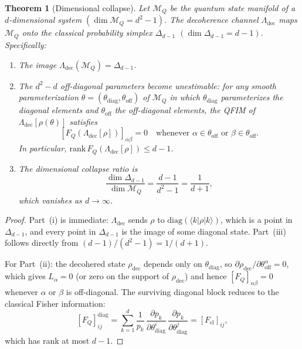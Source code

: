 \documentclass[12pt,a4paper]{article}
\newtheorem{theorem}{Theorem}[section]
\theoremstyle{definition}
\theoremstyle{remark}
\begin{document}
\begin{theorem}[Dimensional collapse]
\label{thm:dim-collapse}
Let $\mathcal{M}_Q$ be the quantum state manifold of a $d$-dimensional system $(\dim \mathcal{M}_Q = d^2 - 1)$. The decoherence channel $\Lambda_{\mathrm{dec}}$ maps $\mathcal{M}_Q$ onto the classical probability simplex $\Delta_{d-1}$ $(\dim \Delta_{d-1} = d-1)$. Specifically:

\begin{enumerate}
\item[\emph{(i)}] The image $\Lambda_{\mathrm{dec}}(\mathcal{M}_Q) = \Delta_{d-1}$.

\item[\emph{(ii)}] The $d^2 - d$ off-diagonal parameters become unestimable: for any smooth parameterization $\theta = (\theta_{\mathrm{diag}}, \theta_{\mathrm{off}})$ of $\mathcal{M}_Q$ in which $\theta_{\mathrm{diag}}$ parameterizes the diagonal elements and $\theta_{\mathrm{off}}$ the off-diagonal elements, the QFIM of $\Lambda_{\mathrm{dec}}[\rho(\theta)]$ satisfies
\begin{equation}
\label{eq:offdiag-vanish}
[F_Q(\Lambda_{\mathrm{dec}}[\rho])]_{\alpha\beta} = 0 \quad \text{whenever } \alpha \in \theta_{\mathrm{off}} \text{ or } \beta \in \theta_{\mathrm{off}}.
\end{equation}
In particular, $\mathrm{rank}\, F_Q(\Lambda_{\mathrm{dec}}[\rho]) \leq d - 1$.

\item[\emph{(iii)}] The dimensional collapse ratio is
\begin{equation}
\label{eq:collapse-ratio}
\frac{\dim \Delta_{d-1}}{\dim \mathcal{M}_Q} = \frac{d-1}{d^2-1} = \frac{1}{d+1},
\end{equation}
which vanishes as $d \to \infty$.
\end{enumerate}
\end{theorem}

\begin{proof}
Part~(i) is immediate: $\Lambda_{\mathrm{dec}}$ sends $\rho$ to $\mathrm{diag}(\langle k|\rho|k\rangle)$, which is a point in $\Delta_{d-1}$, and every point in $\Delta_{d-1}$ is the image of some diagonal state.  Part~(iii) follows directly from $(d-1)/(d^2-1) = 1/(d+1)$.

For Part~(ii): the decohered state $\rho_{\mathrm{dec}}$ depends only on $\theta_{\mathrm{diag}}$, so $\partial \rho_{\mathrm{dec}}/\partial \theta_{\mathrm{off}}^\alpha = 0$, which gives $L_\alpha = 0$ (or zero on the support of $\rho_{\mathrm{dec}}$) and hence $[F_Q]_{\alpha\beta} = 0$ whenever $\alpha$ or $\beta$ is off-diagonal.  The surviving diagonal block reduces to the classical Fisher information:
\begin{equation}
\label{eq:qfim-classical}
[F_Q]_{ij}^{\mathrm{diag}} = \sum_{k=1}^d \frac{1}{p_k}\, \frac{\partial p_k}{\partial \theta_{\mathrm{diag}}^i}\, \frac{\partial p_k}{\partial \theta_{\mathrm{diag}}^j} = [F_{\mathrm{cl}}]_{ij},
\end{equation}
which has rank at most $d - 1$.
\end{proof}
\end{document}
